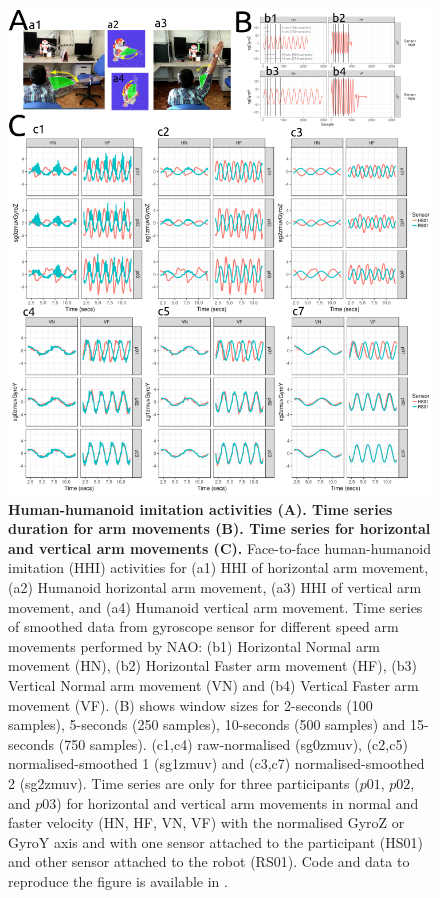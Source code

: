\documentclass[fleqn,10pt]{wlscirep}
\begin{document}
\begin{figure}[ht]
  \centering
\includegraphics[width=1.0\textwidth]{figures/fig02/versions/drawing-v01.png}
    \caption{
	{\bf Human-humanoid imitation activities (A). Time series duration for arm movements (B).
		Time series for horizontal and vertical arm movements (C).
	}
	Face-to-face human-humanoid imitation (HHI) activities for (a1) HHI of horizontal arm movement, (a2) Humanoid horizontal arm movement, (a3) HHI of vertical arm movement, and (a4) Humanoid vertical arm movement.
    Time series of smoothed data from gyroscope sensor for different speed arm movements performed by NAO: (b1) Horizontal Normal arm movement (HN), (b2) Horizontal Faster arm movement (HF), (b3) Vertical Normal arm movement (VN) and (b4) Vertical Faster arm movement (VF).
	(B) shows window sizes for 2-seconds (100 samples), 5-seconds (250 samples), 10-seconds (500 samples) and 15-seconds (750 samples).
	(c1,c4) raw-normalised (sg0zmuv), (c2,c5) normalised-smoothed 1 (sg1zmuv) and (c3,c7) normalised-smoothed 2 (sg2zmuv).
	Time series are only for three participants	($p01$, $p02$, and $p03$) for horizontal and vertical arm movements in normal and faster velocity (HN, HF, VN, VF) with the normalised GyroZ or GyroY axis and with one sensor attached to the participant (HS01) and other sensor attached to the robot (RS01).
	Code and data to reproduce the figure is available in \cite{srep2021}.
}
    \label{fig02}
\end{figure}
\end{document}
